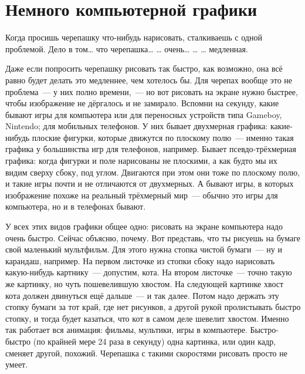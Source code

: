 %
%
%

\chapter{Немного компьютерной графики}\label{ch:abitgraphic}

Когда просишь черепашку что-нибудь нарисовать, сталкиваешь с одной проблемой. Дело в том… что черепашка… … очень… … … медленная.

Даже если попросить черепашку рисовать так быстро, как возможно, она всё равно будет делать это медленнее, чем хотелось бы. Для черепах вообще это не проблема — у них полно времени, — но вот рисовать на экране нужно быстрее, чтобы изображение не дёргалось и не замирало. Вспомни на секунду, какие бывают игры для компьютера или для переносных устройств типа Gameboy, Nintendo; для мобильных телефонов. У них бывает двухмерная графика: какие-нибудь плоские фигурки, которые движутся по плоскому полю — именно такая графика у большинства игр для телефонов, например. Бывает псевдо-трёхмерная графика: когда фигурки и поле нарисованы не плоскими, а как будто мы их видим сверху сбоку, под углом. Двигаются при этом они тоже по плоскому полю, и такие игры почти и не отличаются от двухмерных. А бывают игры, в которых изображение похоже на реальный трёхмерный мир — обычно это игры для компьютера, но и в телефонах бывают.

У всех этих видов графики общее одно: рисовать на экране компьютера надо очень быстро. Сейчас объясню, почему. Вот представь, что ты рисуешь на бумаге свой маленький мультфильм. Для этого нужна стопка чистой бумаги — ну и карандаш, например. На первом листочке из стопки сбоку надо нарисовать какую-нибудь картнику — допустим, кота. На втором листочке — точно такую же картинку, но чуть пошевелившую хвостом. На следующей картинке хвост кота должен двинуться ещё дальше — и так далее. Потом надо держать эту стопку бумаги за тот край, где нет рисунков, а другой рукой пролистывать быстро стопку, и тогда будет казаться, что кот в самом деле шевелит хвостом. Именно так работает вся анимация: фильмы, мультики, игры в компьютере. Быстро-быстро (по крайней мере 24 раза в секунду) одна картинка, или один кадр, сменяет другой, похожий. Черепашка с такими скоростями рисовать просто не умеет.

